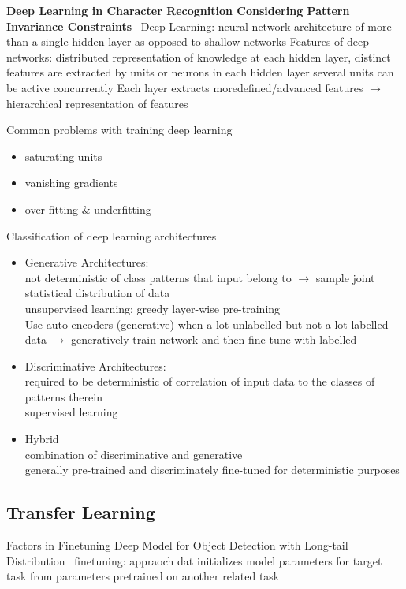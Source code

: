\textbf{Deep Learning in Character Recognition Considering Pattern Invariance
Constraints}~\citep{oyedotun_deep_2015}
Deep Learning: neural network architecture of more than a single hidden layer as opposed to shallow networks
Features of deep networks: distributed representation of knowledge at each hidden layer, distinct
features are extracted by units or neurons in each hidden layer
several units can be active concurrently
Each layer extracts moredefined/advanced features $\rightarrow$ hierarchical representation of
features

Common problems with training deep learning
\begin{itemize}
    \item saturating units
    \item vanishing gradients
    \item over-fitting \& underfitting
\end{itemize}

Classification of deep learning architectures
\begin{itemize}
    \item Generative Architectures:\\
        not deterministic of class patterns that input belong to $\rightarrow$ sample joint
        statistical distribution of data\\
        unsupervised learning: greedy layer-wise pre-training\\
        Use auto encoders (generative) when a lot unlabelled but not a lot labelled data
        $\rightarrow$ generatively train network and then fine tune with labelled
    \item Discriminative Architectures:\\
        required to be deterministic of correlation of input data to the classes of patterns therein\\
        supervised learning
    \item Hybrid\\
        combination of discriminative and generative\\
        generally pre-trained and discriminately fine-tuned for deterministic purposes
\end{itemize}

\subsection*{Transfer Learning}
Factors in Finetuning Deep Model for Object Detection with Long-tail
Distribution~\citep{ouyang_factors_2016}
finetuning: appraoch dat initializes model parameters for target task from parameters pretrained on
another related task

